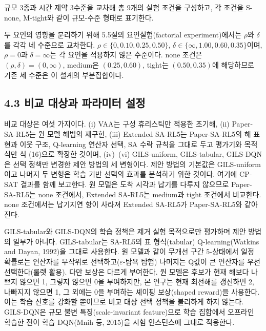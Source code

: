 \documentclass[10pt,a4paper]{article}
\begin{document}
규모 3종과 시간 제약 3수준을 교차해 총 9개의 실험 조건을 구성하고, 각 조건을 S-none,
M-tight와 같이 규모-수준 형태로 표기한다.

두 요인의 영향을 분리하기 위해 5.5절의 요인실험(factorial experiment)에서는 $\rho$와 $\delta$를 각각 네 수준으로 교차한다. $\rho\in\{0,0.10,0.25,0.50\}$, $\delta\in\{\infty,1.00,0.60,0.35\}$이며, $\rho=0$과 $\delta=\infty$는 각 요인을 적용하지 않은 수준이다. none 조건은 $(\rho,\delta)=(0,\infty)$, medium은 $(0.25,0.60)$, tight는 $(0.50,0.35)$에 해당하므로 기존 세 수준은 이 설계의 부분집합이다.

\subsection{4.3 비교 대상과 파라미터 설정}
비교 대상은 여섯 가지이다. (i) VAA는 구성 휴리스틱만 적용한 초기해, (ii) Paper-SA-RL5는 원
모델 해법의 재구현, (iii) Extended SA-RL5는 Paper-SA-RL5의 해 표현과 이웃 구조, Q-learning 연산자 선택, SA 수락 규칙을 그대로 두고 평가기와 목적식만 식 (16)으로 확장한 것이며,
(iv)--(vi) GILS-uniform, GILS-tabular, GILS-DQN은 선택 정책만 변경한 제안
방법의 세 변형이다. 제안 방법의 기본값은 GILS-uniform이고 나머지 두 변형은 학습 기반
선택의 효과를 분석하기 위한 것이다. 여기에 CP-SAT 결과를 함께 보고한다. 원 모델은 도착
시각과 납기를 다루지 않으므로 Paper-SA-RL5는 none 조건에서, Extended SA-RL5는 medium과
tight 조건에서 비교한다. none 조건에서는 납기지연 항이 사라져 Extended SA-RL5가
Paper-SA-RL5와 같아진다.

GILS-tabular와 GILS-DQN의 학습 정책은 제거 실험 목적으로만 평가하며 제안 방법의 일부가 아니다. GILS-tabular는 SA-RL5의 표 형식(tabular) Q-learning(Watkins and Dayan, 1992)을 그대로 사용한다. 원 모델과 같이 무개선 구간 5-상태에서 일정 확률로는 연산자를 무작위로 선택하고($\varepsilon$-탐욕 탐험) 나머지는 Q값이 큰 연산자를 우선 선택한다(룰렛 활용). 다만 보상은 다르게 부여한다. 원 모델은 후보가 현재 해보다 나쁘지 않으면 1, 그렇지 않으면 0을 부여하지만, 본 연구는 현재 최선해를 갱신하면 2, 나빠지지 않으면 1, 그 외에는 0을 부여하는 셰이핑 보상(shaped reward)을 사용한다. 이는 학습 신호를 강화할 뿐이므로 비교 대상 선택 정책을 불리하게 하지 않는다. GILS-DQN은 규모 불변 특징(scale-invariant feature)으로 학습 집합에서 오프라인 학습한 전이 학습 DQN(Mnih 등, 2015)을 시험 인스턴스에 그대로 적용한다.
\end{document}
